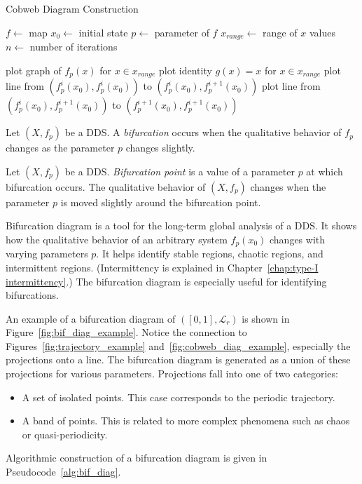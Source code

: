 \begin{algorithm}
\caption{Cobweb Diagram Construction}\label{cobweb_alg}
\begin{algorithmic}[1]
\Statex $f \gets$ map
\Statex $x_0 \gets$ initial state
\Statex $p \gets$ parameter of $f$
\Statex $x_{range} \gets$ range of $x$ values
\Statex $n \gets$ number of iterations

\State plot graph of $f_p(x)$ for $x \in x_{range}$
\State plot identity $g(x)=x$ for $x \in x_{range}$
\State plot line from $(f_{p}^{i}(x_0), f_{p}^{i}(x_0))$ to $(f_{p}^{i}(x_0), f_{p}^{i+1}(x_0))$
\State plot line from $(f_{p}^{i}(x_0), f_{p}^{i+1}(x_0))$ to $(f_{p}^{i+1}(x_0), f_{p}^{i+1}(x_0))$
\EndFor

\end{algorithmic}
\end{algorithm}

\begin{definition}[Bifurcation]
\label{def:bifurcation}
    Let $\left( X, f_p \right)$ be a DDS.
    A \emph{bifurcation} occurs when the qualitative behavior of $f_p$ changes as the parameter $p$ changes slightly.
\end{definition}

\begin{definition}
\label{def:bifurcation_point}
    Let $\left( X, f_p \right)$ be a DDS.
    \emph{Bifurcation point} is a value of a parameter $p$ at which bifurcation occurs.
    The qualitative behavior of $\left( X, f_{p} \right)$ changes when the parameter $p$ is moved slightly around the bifurcation point.
\end{definition}

\begin{remark}
\label{def: bif_diag} 
    Bifurcation diagram is a tool for the long-term global analysis of a DDS.
    It shows how the qualitative behavior of an arbitrary system $f_{p}(x_0)$ changes with varying parameters $p$.
    It helps identify stable regions, chaotic regions, and intermittent regions. (Intermittency is explained in Chapter~\ref{chap:type-I intermittency}.)
    The bifurcation diagram is especially useful for identifying bifurcations.
    \par
    An example of a bifurcation diagram of $\left( [0,1], \mathcal{L}_{r} \right)$ is shown in Figure~\ref{fig:bif_diag_example}.
    Notice the connection to Figures~\ref{fig:trajectory_example} and~\ref{fig:cobweb_diag_example}, especially the projections onto a line.
    The bifurcation diagram is generated as a union of these projections for various parameters.
    Projections fall into one of two categories:
    \begin{itemize}
        \item{A set of isolated points. This case corresponds to the periodic trajectory.}
        \item{A band of points. This is related to more complex phenomena such as chaos or quasi-periodicity.}
    \end{itemize}
    \par
    Algorithmic construction of a bifurcation diagram is given in Pseudocode~\ref{alg:bif_diag}.
\end{remark}

